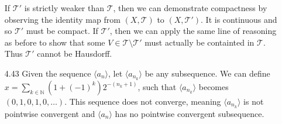 \documentclass[11pt,letter]{article}
\begin{document}
\begin{enumerate}
    If $\mathcal{T}'$ is strictly weaker than $\mathcal{T}$, then we can demonstrate compactness by observing the identity map from $(X,\mathcal{T})$ to $(X,\mathcal{T}')$. It is continuous and so $\mathcal{T}'$ must be compact. If $\mathcal{T}'$, then we can apply the same line of reasoning as before to show that some $V \in \mathcal{T}\setminus \mathcal{T}'$ must actually be containted in $\mathcal{T}$. Thus $\mathcal{T}'$ cannot be Hausdorff.
    
    \item[4.43] Given the sequence $\langle a_n \rangle$, let $\langle a_{n_k} \rangle$ be any subsequence. We can define $x = \sum_{k \in \mathbb{N}} (1 + (-1)^k)2^{-(n_k + 1)}$, such that $\langle a_{n_k} \rangle$ becomes $(0,1,0,1,0,\dots)$. This sequence does not converge, meaning $\langle a_{n_k} \rangle$ is not pointwise convergent and $\langle a_n \rangle$ has no pointwise convergent subsequence.
\end{enumerate}
\end{document}
